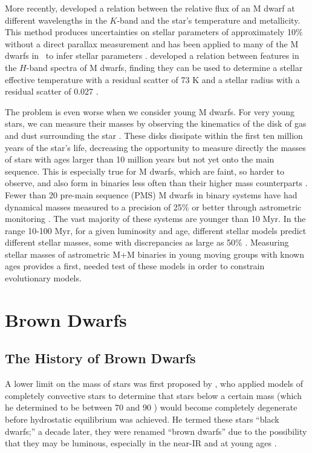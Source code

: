 More recently, \citet{RojasAyala12} developed a relation between the relative flux
of an M dwarf at different wavelengths in the $K$-band and the star's temperature
and metallicity.
This method produces uncertainties on stellar parameters of approximately 10\% without
a direct parallax measurement and has been applied to many of the M dwarfs
in \kep\ to infer stellar parameters \citep{Muirhead12b, Muirhead14}.
\citet{Newton15} developed a relation between features in the $H$-band spectra of M dwarfs,
finding they can be used to determine a stellar effective temperature with a residual
scatter of 73 K and a stellar radius with a residual scatter of 0.027 \rsun.



The problem is even worse when we consider young M dwarfs.
For very young stars, we can measure their masses by observing the kinematics of
the disk of gas and dust surrounding the star \citep{Czekala15, Czekala16}.
These disks dissipate within the first ten million years of the star's life, decreasing the opportunity to measure directly the masses of stars with ages larger than 10 million years but not yet onto the main sequence. 
This is especially true for M dwarfs, which are faint, so harder to observe, and also 
form in binaries less often than their higher mass counterparts \citep{Fischer92, Shan15}.
Fewer than 20 pre-main sequence (PMS) M dwarfs in binary systems have had dynamical masses measured to a
precision of 25\% or better through astrometric monitoring \citep{Dupuy14}.
The vast majority of these systems are younger than 10 Myr.
In the range 10-100 Myr, for a given luminosity and age, different stellar models predict different stellar masses, some with discrepancies as large as 50\% \citep{Hillenbrand04,Schlieder14}.
Measuring stellar masses of astrometric M+M binaries in young moving groups with known 
ages provides a first, needed test of these models in order to constrain evolutionary models.

\section{Brown Dwarfs}
\label{sec:BDs}

\subsection{The History of Brown Dwarfs}


A lower limit on the mass of stars was first proposed by \citet{Kumar63}, who applied models of completely
convective stars to determine that stars below a certain mass (which he determined to be between 
70 and 90 \mjup) would become completely degenerate before hydrostatic equilibrium was achieved.
He termed these stars ``black dwarfs;'' a decade later, they were renamed ``brown dwarfs'' due to the 
possibility that they may be luminous, especially in the near-IR and at young ages \citep{Tarter75}.

